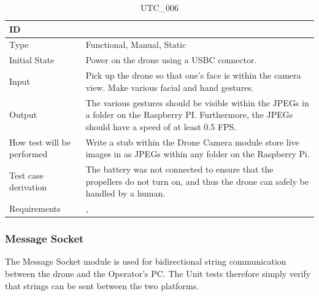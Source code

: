 \documentclass[12pt, titlepage]{article}
\begin{document}
\begin{table}[!h]
\begin{center}
\caption {UTC\_006}
\label{tab:UTC_006}
\begin{tabular}{ | m{3.2cm} | m{12.2cm} | } 
\hline
ID & \nameref{tab:UTC_006} \\ 
\hline
Type &  Functional, Manual, Static  \\ 
\hline
Initial State &  Power on the drone using a USBC connector. \\ 
\hline
Input & Pick up the drone so that one's face is within the camera view. Make various facial and hand gestures.\\ 
\hline
Output &  The various gestures should be visible within the JPEGs in a folder on the Raspberry PI. Furthermore, the JPEGs should have a speed of at least 0.5 FPS.\\ 
\hline
How test will be performed & Write a stub within the Drone Camera module store live images in as JPEGs within any folder on the Raspberry Pi. \\ 
\hline
Test case derivation &  The battery was not connected to ensure that the propellers do not turn on, and thus the drone can safely be handled by a human. \\ 
\hline
Requirements & \nameref{GEN_002}, \nameref{PERF_004} \\ 
\hline
\end{tabular}
\end{center}
\end{table}


\subsubsection{Message Socket}

The Message Socket module is used for bidirectional string communication between the drone and the Operator's PC. The Unit tests therefore simply verify that strings can be sent between the two platforms. 
\end{document}
